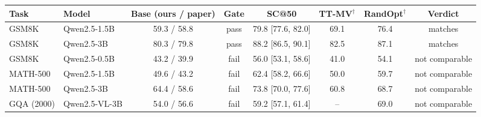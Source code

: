 \begin{tabular}{llcccccc}
\toprule
Task & Model & Base (ours / paper) & Gate & SC@50 & TT-MV$^\dagger$ & RandOpt$^\dagger$ & Verdict \\
\midrule
GSM8K & Qwen2.5-1.5B & 59.3 / 58.8 & pass & 79.8 [77.6, 82.0] & 69.1 & 76.4 & matches \\
GSM8K & Qwen2.5-3B & 80.3 / 79.8 & pass & 88.2 [86.5, 90.1] & 82.5 & 87.1 & matches \\
GSM8K & Qwen2.5-0.5B & 43.2 / 39.9 & fail & 56.0 [53.1, 58.6] & 41.0 & 54.1 & not comparable \\
MATH-500 & Qwen2.5-1.5B & 49.6 / 43.2 & fail & 62.4 [58.2, 66.6] & 50.0 & 59.7 & not comparable \\
MATH-500 & Qwen2.5-3B & 64.4 / 58.6 & fail & 73.8 [70.0, 77.6] & 60.8 & 68.7 & not comparable \\
GQA (2000) & Qwen2.5-VL-3B & 54.0 / 56.6 & fail & 59.2 [57.1, 61.4] & -- & 69.0 & not comparable \\
\bottomrule
\end{tabular}
